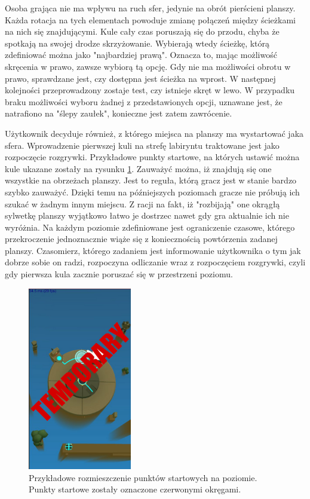 \documentclass[a4paper,12pt,numbers=noenddot]{report}
\begin{document}
Osoba grająca nie ma wpływu na ruch sfer, jedynie na obrót pierścieni planszy. Każda rotacja na tych elementach powoduje zmianę połączeń między ścieżkami na nich się znajdującymi. Kule cały czas poruszają się do przodu, chyba że spotkają na swojej drodze skrzyżowanie. Wybierają wtedy ścieżkę, którą zdefiniować można jako "najbardziej prawą". Oznacza to, mając możliwość skręcenia w prawo, zawsze wybiorą tą opcję. Gdy nie ma możliwości obrotu w prawo, sprawdzane jest, czy dostępna jest ścieżka na wprost. W następnej kolejności przeprowadzony zostaje test, czy istnieje skręt w lewo. W przypadku braku możliwości wyboru żadnej z przedstawionych opcji, uznawane jest, że natrafiono na "ślepy zaułek", konieczne jest zatem zawrócenie.

Użytkownik decyduje również, z którego miejsca na planszy ma wystartować jaka sfera. Wprowadzenie pierwszej kuli na strefę labiryntu traktowane jest jako rozpoczęcie rozgrywki. Przykładowe punkty startowe, na których ustawić można kule ukazane zostały na rysunku \ref{fig:sphaze_startpoints_1}. Zauważyć można, iż znajdują się one wszystkie na obrzeżach planszy. Jest to reguła, którą gracz jest w stanie bardzo szybko zauważyć. Dzięki temu na późniejszych poziomach gracze nie próbują ich szukać w żadnym innym miejscu. Z racji na fakt, iż "rozbijają" one okrągłą sylwetkę planszy wyjątkowo łatwo je dostrzec nawet gdy gra aktualnie ich nie wyróżnia. 
Na każdym poziomie zdefiniowane jest ograniczenie czasowe, którego przekroczenie jednoznacznie wiąże się z koniecznością powtórzenia zadanej planszy. Czasomierz, którego zadaniem jest informowanie użytkownika o tym jak dobrze sobie on radzi, rozpoczyna odliczanie wraz z rozpoczęciem rozgrywki, czyli gdy pierwsza kula zacznie poruszać się w przestrzeni poziomu. 

\begin{figure}[h!]
	\centering
  	\includegraphics[height=8cm]{fig/tmp.jpg}
	\caption{Przykładowe rozmieszczenie punktów startowych na poziomie. Punkty startowe zostały oznaczone czerwonymi okręgami.}
	\label{fig:sphaze_startpoints_1}
\end{figure}
\end{document}
